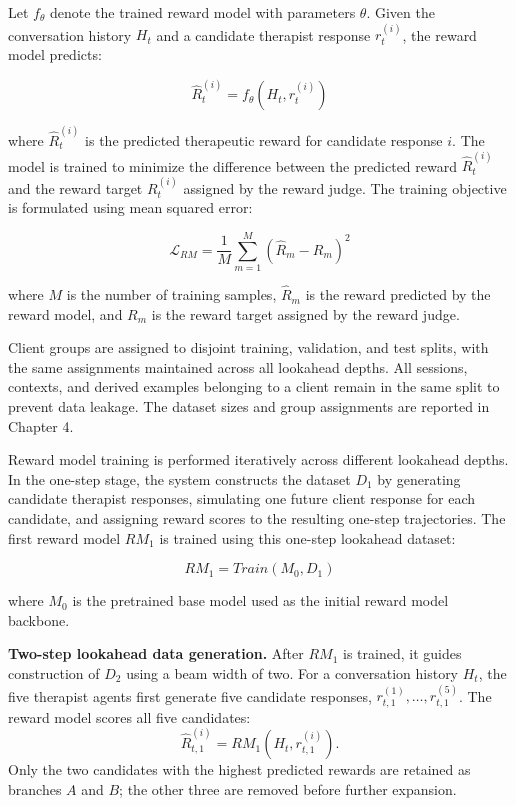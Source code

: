 Let \(f_{\theta}\) denote the trained reward model with parameters \(\theta\). Given the conversation history \(H_t\) and a candidate therapist response \(r_t^{(i)}\), the reward model predicts:

\[
\hat{R}_t^{(i)} = f_{\theta}(H_t, r_t^{(i)})
\]

where \(\hat{R}_t^{(i)}\) is the predicted therapeutic reward for candidate response \(i\). The model is trained to minimize the difference between the predicted reward \(\hat{R}_t^{(i)}\) and the reward target \(R_t^{(i)}\) assigned by the reward judge. The training objective is formulated using mean squared error:

\[
\mathcal{L}_{RM} = \frac{1}{M}\sum_{m=1}^{M}\left(\hat{R}_m - R_m\right)^2
\]

where \(M\) is the number of training samples, \(\hat{R}_m\) is the reward predicted by the reward model, and \(R_m\) is the reward target assigned by the reward judge.

Client groups are assigned to disjoint training, validation, and test splits, with the same assignments maintained across all lookahead depths. All sessions, contexts, and derived examples belonging to a client remain in the same split to prevent data leakage. The dataset sizes and group assignments are reported in Chapter 4.

Reward model training is performed iteratively across different lookahead depths. In the one-step stage, the system constructs the dataset \(D_1\) by generating candidate therapist responses, simulating one future client response for each candidate, and assigning reward scores to the resulting one-step trajectories. The first reward model \(RM_1\) is trained using this one-step lookahead dataset:

\[
RM_1 = Train(M_0, D_1)
\]

where \(M_0\) is the pretrained base model used as the initial reward model backbone.

\textbf{Two-step lookahead data generation.}
After \(RM_1\) is trained, it guides construction of \(D_2\) using a beam width of two. For a conversation history \(H_t\), the five therapist agents first generate five candidate responses, \(r_{t,1}^{(1)},\ldots,r_{t,1}^{(5)}\). The reward model scores all five candidates:
\begin{equation}
\hat{R}_{t,1}^{(i)}=RM_1(H_t,r_{t,1}^{(i)}).
\end{equation}
Only the two candidates with the highest predicted rewards are retained as branches \(A\) and \(B\); the other three are removed before further expansion.

